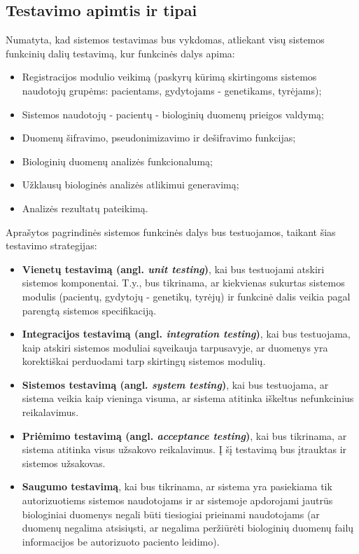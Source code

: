 \documentclass[12pt]{article}
\begin{document}
\subsection{Testavimo apimtis ir tipai}
\label{sec:SCOPE}
Numatyta, kad sistemos testavimas bus vykdomas, atliekant visų sistemos
funkcinių dalių testavimą, kur funkcinės dalys apima:
\begin{itemize}
    \item Registracijos modulio veikimą (paskyrų kūrimą skirtingoms sistemos
    naudotojų grupėms: pacientams, gydytojams - genetikams, tyrėjams);
    \item Sistemos naudotojų - pacientų - biologinių duomenų prieigos valdymą;
    \item Duomenų šifravimo, pseudonimizavimo ir dešifravimo funkcijas;
    \item Biologinių duomenų analizės funkcionalumą;
    \item Užklausų biologinės analizės atlikimui generavimą;
    \item Analizės rezultatų pateikimą.
\end{itemize}

Aprašytos pagrindinės sistemos funkcinės dalys bus testuojamos, taikant šias
testavimo strategijas:
\begin{itemize}
    \item \textbf{Vienetų testavimą (angl. \emph{unit testing})}, kai bus
    testuojami atskiri sistemos komponentai. T.y., bus tikrinama, ar kiekvienas
    sukurtas sistemos modulis (pacientų, gydytojų - genetikų, tyrėjų) ir
    funkcinė dalis veikia pagal parengtą sistemos specifikaciją.
    \item \textbf{Integracijos testavimą (angl. \emph{integration testing})},
    kai bus testuojama, kaip atskiri sistemos moduliai sąveikauja tarpusavyje,
    ar duomenys yra korektiškai perduodami tarp skirtingų sistemos modulių.
    \item \textbf{Sistemos testavimą (angl. \emph{system testing})}, kai bus
    testuojama, ar sistema veikia kaip vieninga visuma, ar sistema atitinka
    iškeltus nefunkcinius reikalavimus.
    \item \textbf{Priėmimo testavimą (angl. \emph{acceptance testing})}, kai bus
    tikrinama, ar sistema atitinka visus užsakovo reikalavimus. Į šį testavimą
    bus įtrauktas ir sistemos užsakovas.
    \item \textbf{Saugumo testavimą}, kai bus tikrinama, ar sistema yra
    pasiekiama tik autorizuotiems sistemos naudotojams ir ar sistemoje
    apdorojami jautrūs biologiniai duomenys negali būti tiesiogiai prieinami
    naudotojams (ar duomenų negalima atsisiųsti, ar negalima peržiūrėti
    biologinių duomenų failų informacijos be autorizuoto paciento leidimo).
\end{itemize}
\end{document}
